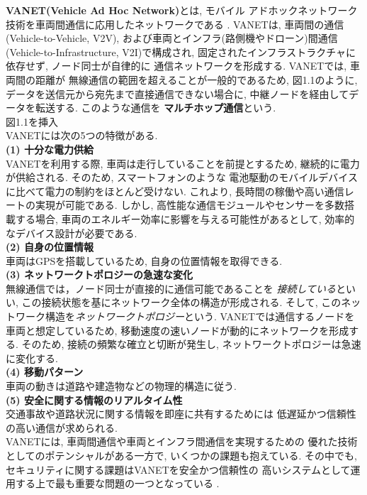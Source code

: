 \textbf{VANET(Vehicle Ad Hoc Network)}とは, モバイル
アドホックネットワーク技術を車両間通信に応用したネットワークである
\cite{adhoc, vanet}. VANETは, 車両間の通信(Vehicle-to-Vehicle, 
V2V), および車両とインフラ(路側機やドローン)間通信
(Vehicle-to-Infrastructure, V2I)\cite{drone}で構成され, 
固定されたインフラストラクチャに依存せず, ノード同士が自律的に
通信ネットワークを形成する. VANETでは, 車両間の距離が
無線通信の範囲を超えることが一般的であるため, 図1.1のように, 
データを送信元から宛先まで直接通信できない場合に, 
中継ノードを経由してデータを転送する. このような通信を
\textbf{マルチホップ通信}という.\\


{\Huge 図1.1を挿入}\\

VANETには次の5つの特徴がある.\\[0.5em]
\noindent\textbf{(1) 十分な電力供給}\\
\indent VANETを利用する際, 車両は走行していることを前提とするため, 
継続的に電力が供給される. そのため, スマートフォンのような
電池駆動のモバイルデバイスに比べて電力の制約をほとんど受けない. 
これより, 長時間の稼働や高い通信レートの実現が可能である. 
しかし, 高性能な通信モジュールやセンサーを多数搭載する場合, 
車両のエネルギー効率に影響を与える可能性があるとして, 
効率的なデバイス設計が必要である.\\[1em]
\noindent\textbf{(2) 自身の位置情報}\\
\indent 車両はGPSを搭載しているため,  自身の位置情報を取得できる.\\[1em]
\noindent\textbf{(3) ネットワークトポロジーの急速な変化}\\
\indent 無線通信では，ノード同士が直接的に通信可能であることを
\emph{接続している}といい, この接続状態を基にネットワーク全体の構造が形成される.
そして, このネットワーク構造を\emph{ネットワークトポロジー}という. 
VANETでは通信するノードを車両と想定しているため, 
移動速度の速いノードが動的にネットワークを形成する. 
そのため, 接続の頻繁な確立と切断が発生し, 
ネットワークトポロジーは急速に変化する. \\[1em]
\noindent\textbf{(4) 移動パターン}\\
\indent 車両の動きは道路や建造物などの物理的構造に従う.\\[1em]
\noindent\textbf{(5) 安全に関する情報のリアルタイム性}\\
\indent 交通事故や道路状況に関する情報を即座に共有するためには 
低遅延かつ信頼性の高い通信が求められる.\\

VANETには, 車両間通信や車両とインフラ間通信を実現するための
優れた技術としてのポテンシャルがある一方で, 
いくつかの課題も抱えている.
その中でも, セキュリティに関する課題はVANETを安全かつ信頼性の
高いシステムとして運用する上で最も重要な問題の一つとなっている
\cite{vanet-challenge,vanet-security}.\\


